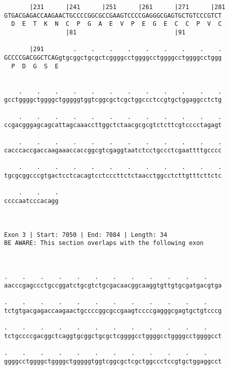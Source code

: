 \documentclass{article}
\begin{document}
\begin{Verbatim}
       |231      |241      |251      |261      |271      |281
GTGACGAGACCAAGAACTGCCCCGGCGCCGAAGTCCCCGAGGGCGAGTGCTGTCCCGTCT
  D  E  T  K  N  C  P  G  A  E  V  P  E  G  E  C  C  P  V  C
                 |81                           |91          
  
       |291        .    .    .    .    .    .    .    .    .
GCCCCGACGGCTCAGgtgcggctgcgctcggggcctggggcctggggcctggggcctggg
  P  D  G  S  E                                             
                                                            
  
    .    .    .    .    .    .    .    .    .    .    .    .
gcctggggctggggctgggggtggtcggcgctcgctggccctccgtgctggaggcctctg
                                                            
    .    .    .    .    .    .    .    .    .    .    .    .
ccgacgggagcagcattagcaaaccttggctctaacgcgcgtctcttcgtcccctagagt
                                                            
    .    .    .    .    .    .    .    .    .    .    .    .
cacccaccgaccaagaaaccaccggcgtcgaggtaatctcctgccctcgaattttgcccc
                                                            
    .    .    .    .    .    .    .    .    .    .    .    .
tgcgcggcccgtgactcctcacagtcctcccttctctaacctggcctcttgtttcttctc
                                                            
    .    .    .
ccccaatcccacagg
               
               
 
Exon 3 | Start: 7050 | End: 7084 | Length: 34
BE AWARE: This section overlaps with the following exon



.    .    .    .    .    .    .    .    .    .    .    .    
aacccgagccctgccggatctgcgtctgcgacaacggcaaggtgttgtgcgatgacgtga
                                                            
.    .    .    .    .    .    .    .    .    .    .    .    
tctgtgacgagaccaagaactgccccggcgccgaagtccccgagggcgagtgctgtcccg
                                                            
.    .    .    .    .    .    .    .    .    .    .    .    
tctgccccgacggctcaggtgcggctgcgctcggggcctggggcctggggcctggggcct
                                                            
.    .    .    .    .    .    .    .    .    .    .    .    
ggggcctggggctggggctgggggtggtcggcgctcgctggccctccgtgctggaggcct
                                                            

\end{Verbatim}
\end{document}

